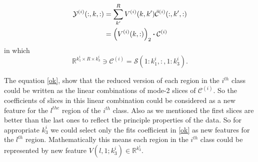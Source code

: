 \documentclass[journal]{IEEEtran}
\newcommand{\trans}{\mathsf{T}}
\begin{document}
	\begin{align}
	\label{ok}
	{\mathcal{Y}}^{(i)}(:,k,:) &= \sum_{k'}^{R} V^{(i)}(k,k')\bar{\mathcal{C}}^{(i)}(:,k',:) \notag
	\\&= \left( V^{(i)}(k,:)\right)_2 \boldsymbol{\cdot} {\mathcal{C}}^{(i)}
	\end{align}
	in which 
	\[
	\mathbb{R}^{k_1^i\times R \times k_3^i}\ni {\mathcal{C}}^{(i)} = \mathcal{S}(1:k_1^i,:,1:k_3^i).
	\]
	
	The equation \eqref{ok}, show that the reduced version of each region in the $i^{th}$ class could be
	written as the linear combinations of  mode-2 slices of $\mathcal{C}^{(i)}$. So the coefficients of slices in this linear combination could be considered as a new feature for the $l^{the}$ region of the $i^{th}$ class. Also as we mentioned the first slices are better than the last ones to reflect the principle properties of the data. So for appropriate $k_3^i$ we could select only the fits coefficient in \eqref{ok} as  new features for the $l^{th}$ region. Mathematically this means each region  in the $i^{th}$ class could be represented by new feature $V(l,1;k_3^i)\in \mathbb{R}^{k_3^i}$.   
	
\end{document}

